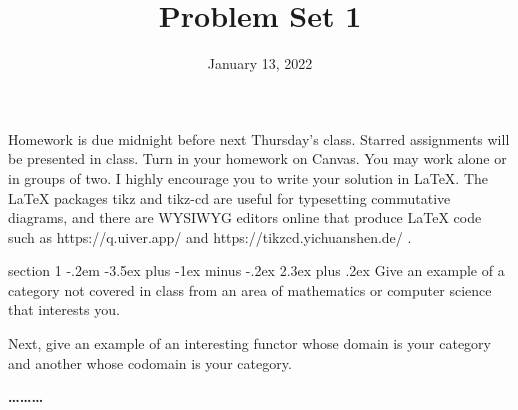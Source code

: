 \documentclass[12pt]{article}
\makeatletter
\newenvironment{problem}{\@startsection
       {section}
       {1}
       {-.2em}
       {-3.5ex plus -1ex minus -.2ex}
       {2.3ex plus .2ex}
       {\pagebreak[3]%
       \large\bf\noindent{Problem }
       }
       }
       {%
       \begin{center}\large\bf \ldots\ldots\ldots\end{center}}
\makeatother
\begin{document}
\newcommand{\skipp}{\textrm{skip}}
\newcommand{\Set}{\textrm{Set}}
\newcommand{\Cat}{\textrm{Cat}}
\newcommand{\Cayley}{\textrm{Cayley}}
\newcommand{\Preds}{\mathcal{P}}
\newcommand{\triple}[3]{\{#1\}{#2}\{#3\}}
\newcommand{\Triple}{\textrm{Triple}}
\newcommand{\Analyse}{\textrm{Analyse}}
\newcommand{\command}{\textrm{command}}

\title{Problem Set 1}
\date{January 13, 2022}
\maketitle

Homework is due midnight before next Thursday's class. Starred
assignments will be presented in class. Turn in your homework on
Canvas. You may work alone or in groups of two. I highly encourage you
to write your solution in LaTeX. The LaTeX packages tikz and tikz-cd
are useful for typesetting commutative diagrams, and there are WYSIWYG
editors online that produce LaTeX code such as https://q.uiver.app/
and https://tikzcd.yichuanshen.de/ .

\thispagestyle{empty}


\begin{problem}{}
  Give an example of a category not covered in class from an area of
  mathematics or computer science that interests you.

  Next, give an example of an interesting functor whose domain is your
  category and another whose codomain is your category.
\end{problem}
\end{document}

